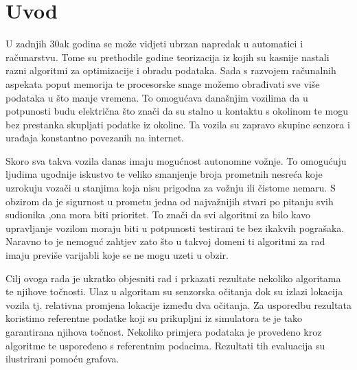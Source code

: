 \chapter{Uvod}

U zadnjih 30ak godina se može vidjeti ubrzan napredak u automatici i računarstvu. Tome su prethodile godine teorizacija iz kojih su kasnije nastali razni algoritmi za optimizacije i obradu podataka. Sada s razvojem računalnih aspekata poput memorija te procesorske snage možemo obrađivati sve više podataka u što manje vremena. To omogućava današnjim vozilima da u potpunosti budu električna što znači da su stalno u kontaktu s okolinom te mogu bez prestanka skupljati podatke iz okoline. Ta vozila su zapravo skupine senzora i urađaja konstantno povezanih na internet.

Skoro sva takva vozila danas imaju mogućnost autonomne vožnje. To omogućuju ljudima ugodnije iskustvo te veliko smanjenje broja prometnih nesreća koje uzrokuju vozači u stanjima koja nisu prigodna za vožnju ili čistome nemaru. S obzirom da je sigurnost u prometu jedna od najvažnijih stvari po pitanju svih sudionika ,ona mora biti prioritet. To znači da svi algoritmi za bilo kavo upravljanje vozilom moraju biti u potpunosti testirani te bez ikakvih pograšaka. Naravno to je nemoguć zahtjev zato što u takvoj domeni ti algoritmi za rad imaju previše varijabli koje se ne mogu uzeti u obzir. 

Cilj ovoga rada je ukratko objesniti rad i prkazati rezultate nekoliko algoritama te njihove točnosti. Ulaz u algoritam su senzorska očitanja dok su izlazi lokacija vozila tj. relativna promjena lokacije između dva očitanja. Za usporedbu rezultata koristimo referentne podatke koji su prikupljni iz simulatora te je tako garantirana njihova točnost. Nekoliko primjera podataka je provedeno kroz algoritme te uspoređeno s referentnim podacima. Rezultati tih evaluacija su ilustrirani pomoću grafova. 
